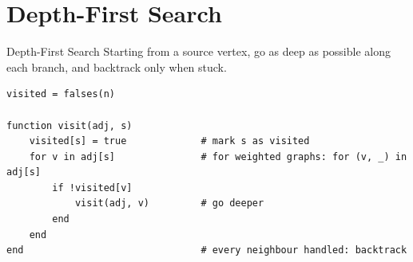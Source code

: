 \documentclass[10pt,aspectratio=169]{beamer}
\begin{document}
\section{Depth-First Search}

\begin{frame}[fragile]{Depth-First Search}
  Starting from a source vertex, go as \alert{deep} as possible along each
  branch, and \alert{backtrack} only when stuck.

  \bigskip
\begin{lstlisting}
visited = falses(n)

function visit(adj, s)
    visited[s] = true             # mark s as visited
    for v in adj[s]               # for weighted graphs: for (v, _) in adj[s]
        if !visited[v]
            visit(adj, v)         # go deeper
        end
    end
end                               # every neighbour handled: backtrack
\end{lstlisting}
\end{frame}
\end{document}
